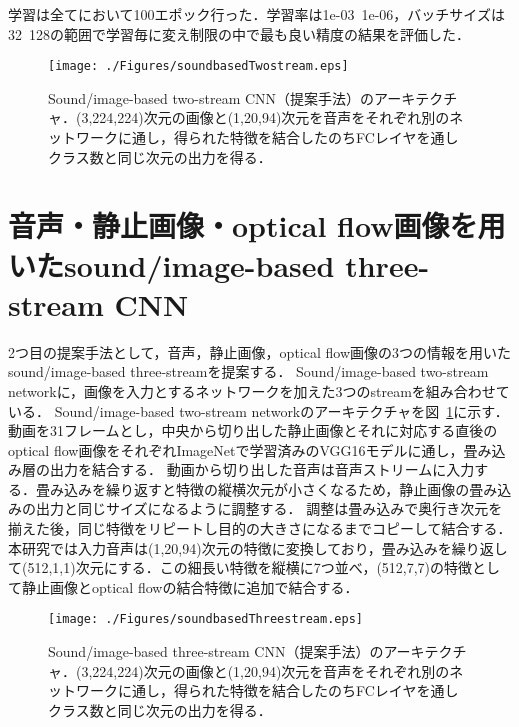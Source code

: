学習は全てにおいて100エポック行った．学習率は1e-03~1e-06，バッチサイズは32~128の範囲で学習毎に変え制限の中で最も良い精度の結果を評価した．


\begin{figure}[htbp]
 \begin{center}
  \texttt{[image: ./Figures/soundbasedTwostream.eps]}
  \caption{Sound/image-based two-stream CNN（提案手法）のアーキテクチャ．(3,224,224)次元の画像と(1,20,94)次元を音声をそれぞれ別のネットワークに通し，得られた特徴を結合したのちFCレイヤを通しクラス数と同じ次元の出力を得る．}
  \label{sound-two-stream}
 \end{center}
\end{figure}



\section{音声・静止画像・optical flow画像を用いたsound/image-based three-stream CNN}
2つ目の提案手法として，音声，静止画像，optical flow画像の3つの情報を用いたsound/image-based three-streamを提案する．
Sound/image-based two-stream networkに，画像を入力とするネットワークを加えた3つのstreamを組み合わせている．
Sound/image-based two-stream networkのアーキテクチャを図~\ref{sound-two-stream}に示す．
動画を31フレームとし，中央から切り出した静止画像とそれに対応する直後のoptical flow画像をそれぞれImageNetで学習済みのVGG16モデルに通し，畳み込み層の出力を結合する．
動画から切り出した音声は音声ストリームに入力する．畳み込みを繰り返すと特徴の縦横次元が小さくなるため，静止画像の畳み込みの出力と同じサイズになるように調整する．
調整は畳み込みで奥行き次元を揃えた後，同じ特徴をリピートし目的の大きさになるまでコピーして結合する．
本研究では入力音声は(1,20,94)次元の特徴に変換しており，畳み込みを繰り返して(512,1,1)次元にする．この細長い特徴を縦横に7つ並べ，(512,7,7)の特徴として静止画像とoptical flowの結合特徴に追加で結合する．

\begin{figure}[htbp]
 \begin{center}
  \texttt{[image: ./Figures/soundbasedThreestream.eps]}
  \caption{Sound/image-based three-stream CNN（提案手法）のアーキテクチャ．(3,224,224)次元の画像と(1,20,94)次元を音声をそれぞれ別のネットワークに通し，得られた特徴を結合したのちFCレイヤを通しクラス数と同じ次元の出力を得る．}
  \label{sound-three-stream}
 \end{center}
\end{figure}
